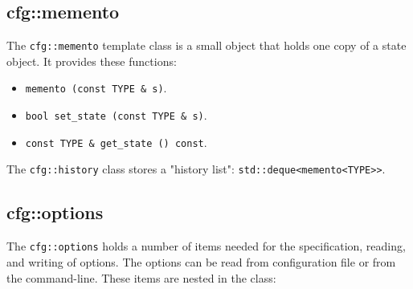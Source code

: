 \subsection{cfg::memento}
\label{subsec:cfg_namespace_memento}

   The \texttt{cfg::memento} template class is a small object that holds one
   copy of a state object.
   It provides these functions:

   \begin{itemize}
      \item \texttt{memento (const TYPE \& s)}.
      \item \texttt{bool set\_state (const TYPE \& s)}.
      \item \texttt{const TYPE \& get\_state () const}.
   \end{itemize}

   The \texttt{cfg::history} class stores a "history list":
   \texttt{std::deque<memento<TYPE>>}.

\subsection{cfg::options}
\label{subsec:cfg_namespace_options}

   The \texttt{cfg::options} holds a number of items needed for the
   specification, reading, and writing of options.
   The options can be read from configuration file or from the command-line.
   These items are nested in the class:

